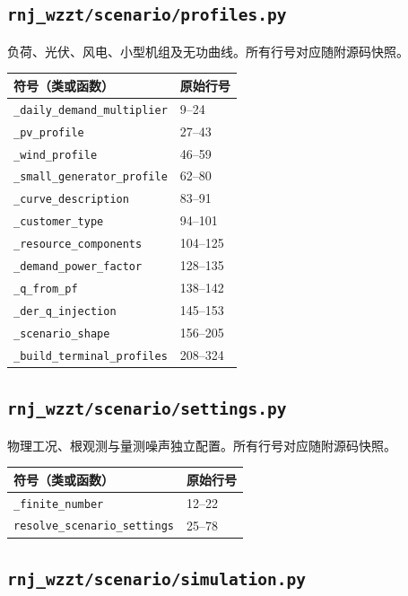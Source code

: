 \subsection{\texorpdfstring{\nolinkurl{rnj_wzzt/scenario/profiles.py}}{rnj\_wzzt/scenario/profiles.py}}\label{module:scenario.profiles}
负荷、光伏、风电、小型机组及无功曲线。所有行号对应随附源码快照。
\begin{longtable}{P{0.73\textwidth}P{0.18\textwidth}}\toprule 符号（类或函数） & 原始行号\\\midrule\endhead
\nolinkurl{_daily_demand_multiplier} & 9--24 \\
\nolinkurl{_pv_profile} & 27--43 \\
\nolinkurl{_wind_profile} & 46--59 \\
\nolinkurl{_small_generator_profile} & 62--80 \\
\nolinkurl{_curve_description} & 83--91 \\
\nolinkurl{_customer_type} & 94--101 \\
\nolinkurl{_resource_components} & 104--125 \\
\nolinkurl{_demand_power_factor} & 128--135 \\
\nolinkurl{_q_from_pf} & 138--142 \\
\nolinkurl{_der_q_injection} & 145--153 \\
\nolinkurl{_scenario_shape} & 156--205 \\
\nolinkurl{_build_terminal_profiles} & 208--324 \\
\bottomrule\end{longtable}
\subsection{\texorpdfstring{\nolinkurl{rnj_wzzt/scenario/settings.py}}{rnj\_wzzt/scenario/settings.py}}\label{module:scenario.settings}
物理工况、根观测与量测噪声独立配置。所有行号对应随附源码快照。
\begin{longtable}{P{0.73\textwidth}P{0.18\textwidth}}\toprule 符号（类或函数） & 原始行号\\\midrule\endhead
\nolinkurl{_finite_number} & 12--22 \\
\nolinkurl{resolve_scenario_settings} & 25--78 \\
\bottomrule\end{longtable}
\subsection{\texorpdfstring{\nolinkurl{rnj_wzzt/scenario/simulation.py}}{rnj\_wzzt/scenario/simulation.py}}\label{module:scenario.simulation}
